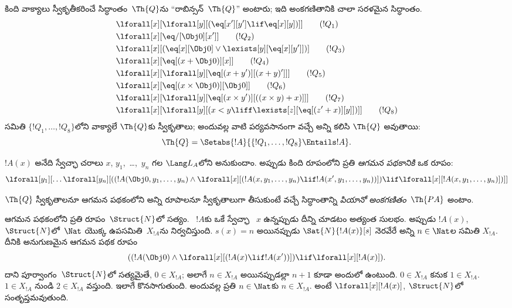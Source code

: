 \documentclass[../../../include/open-logic-section]{subfiles}
\begin{document}
\begin{defn}
కింది వాక్యాలు స్వీకృతీకరించే సిద్ధాంతం~$\Th{Q}$ను ``రాబిన్సన్~$\Th{Q}$''
అంటారు; ఇది అంకగణితానికి చాలా సరళమైన సిద్ధాంతం.
\begin{align*}
& \lforall[x][\lforall[y][(\eq[x'][y'] \lif \eq[x][y])]] \tag{$!Q_1$}\\
& \lforall[x][\eq/[\Obj 0][x']] \tag{$!Q_2$}\\
& \lforall[x][(\eq[x][\Obj 0] \lor \lexists[y][\eq[x][y']])] \tag{$!Q_3$}\\
& \lforall[x][\eq[(x + \Obj 0)][x]] \tag{$!Q_4$}\\
& \lforall[x][\lforall[y][\eq[(x + y')][(x + y)']]] \tag{$!Q_5$}\\
& \lforall[x][\eq[(x \times \Obj 0)][\Obj 0]] \tag{$!Q_6$}\\
& \lforall[x][\lforall[y][\eq[(x \times y')][((x \times y) + x)]]] \tag{$!Q_7$}\\
& \lforall[x][\lforall[y][(x < y \liff \lexists[z][\eq[(z' + x)][y]])]] \tag{$!Q_8$}
\end{align*}
 సమితి $\{!Q_1, \dots, !Q_8\}$లోని వాక్యాలే $\Th{Q}$కు
స్వీకృతాలు; అందువల్ల వాటి పర్యవసానంగా వచ్చే అన్ని
 కలిసి $\Th{Q}$ అవుతాయి:
\[
\Th{Q} = \Setabs{!A}{\{!Q_1, \dots, !Q_8\} \Entails !A}.
\]
\end{defn}

\begin{defn}
$!A(x)$ అనేది స్వేచ్ఛా చరాలు $x$, $y_1$,~\dots,~$y_n$ గల $\Lang L_A$లోని
 అనుకుందాం. అప్పుడు కింది రూపంలోని ప్రతి
 \emph{ఆగమన పథకానికి} ఒక రూపం:
\[
\lforall[y_1][\dots\lforall[y_n][((!A(\Obj 0, y_1, \dots, y_n) \land
\lforall[x][(!A(x, y_1, \dots, y_n) \lif
!A(x', y_1, \dots, y_n))]) \lif
\lforall[x][!A(x, y_1, \dots, y_n)])]]
\]

$\Th{Q}$ స్వీకృతాలనూ ఆగమన పథకంలోని అన్ని రూపాలనూ స్వీకృతాలుగా తీసుకుంటే
వచ్చే సిద్ధాంతాన్ని \emph{పియానో అంకగణితం}~$\Th{PA}$ అంటాం.
\end{defn}

\begin{explain}
ఆగమన పథకంలోని ప్రతి రూపం~$\Struct{N}$లో సత్యం. ~$!A$కు
ఒకే స్వేచ్ఛా ~$x$ ఉన్నప్పుడు దీన్ని చూడటం అత్యంత
సులభం. అప్పుడు $!A(x)$, $\Struct{N}$లో~$\Nat$ యొక్క ఉపసమితి~$X_{!A}$ను
నిర్వచిస్తుంది. $s(x)=n$ అయినప్పుడు $\Sat{N}{!A(x)}[s]$ నెరవేరే అన్ని
$n \in \Nat$ల సమితి $X_{!A}$. దీనికి అనుగుణమైన ఆగమన పథక రూపం
\[
((!A(\Obj 0) \land \lforall[x][(!A(x) \lif !A(x'))]) \lif
  \lforall[x][!A(x)]).
\]
దాని పూర్వాంగం~$\Struct{N}$లో సత్యమైతే, $0 \in X_{!A}$; అలాగే $n \in X_{!A}$
అయినప్పుడల్లా $n+1$ కూడా అందులో ఉంటుంది. $0 \in X_{!A}$ కనుక $1 \in X_{!A}$.
$1 \in X_{!A}$ నుండి $2 \in X_{!A}$ వస్తుంది. ఇలాగే కొనసాగుతుంది. అందువల్ల
ప్రతి $n \in \Nat$కు $n \in X_{!A}$. అంటే $\lforall[x][!A(x)]$,
$\Struct{N}$లో సంతృప్తమవుతుంది.
\end{explain}
\end{document}
